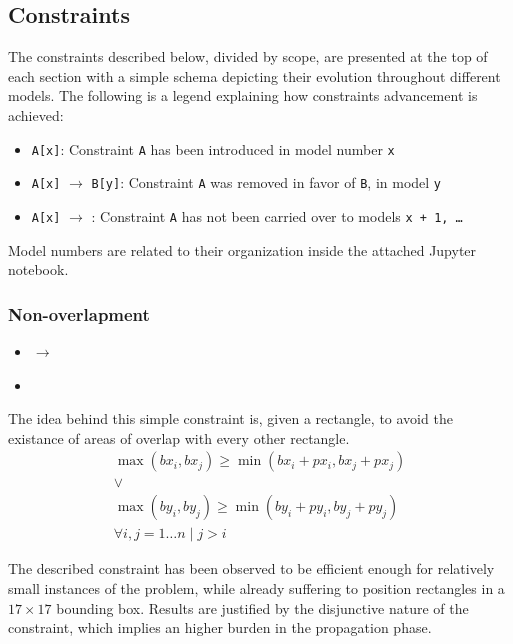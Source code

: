 \documentclass[a4paper,10pt]{article}
\newcommand{\xmark}{\ding{55}}%
\newcounter{subsubsubsection}[subsubsection]
\begin{document}
\subsection{Constraints}
The constraints described below, divided by scope, are presented at the top of each section with a simple schema depicting their evolution throughout different models.
The following is a legend explaining how constraints advancement is achieved:
\begin{itemize}
   \item \texttt{A[x]}: Constraint \texttt{A} has been introduced in model number \texttt{x}
   \item \texttt{A[x]} $\rightarrow$ \texttt{B[y]}: Constraint \texttt{A} was removed in favor of \texttt{B}, in model \texttt{y}
   \item \texttt{A[x]} $\rightarrow$ \xmark: Constraint \texttt{A} has not been carried over to models \texttt{x + 1, \dots}
\end{itemize}
Model numbers are related to their organization inside the attached Jupyter notebook.

\subsubsection{Non-overlapment}
\begin{itemize}
   \item {} $\rightarrow$ 
   \item {}
\end{itemize}

 \label{sec:presents-cannot-overlap}
The idea behind this simple constraint is, given a rectangle, to avoid the existance of areas of overlap with every other rectangle.
\begin{gather*}
   \max({bx_{i}, bx_{j}}) \geq \min({bx_{i} + px_{i}, bx_{j} + px_{j}}) \\
   \vee \\
   \max({by_{i}, by_{j}}) \geq \min({by_{i} + py_{i}, by_{j} + py_{j}}) \\
   \forall{i, j = 1 \dots n \mid j > i}
\end{gather*}

The described constraint has been observed to be efficient enough for relatively small instances of the problem, while already suffering to position rectangles in a $17 \times 17$ bounding box. Results are justified by the disjunctive nature of the constraint, which implies an higher burden in the propagation phase.
\end{document}
